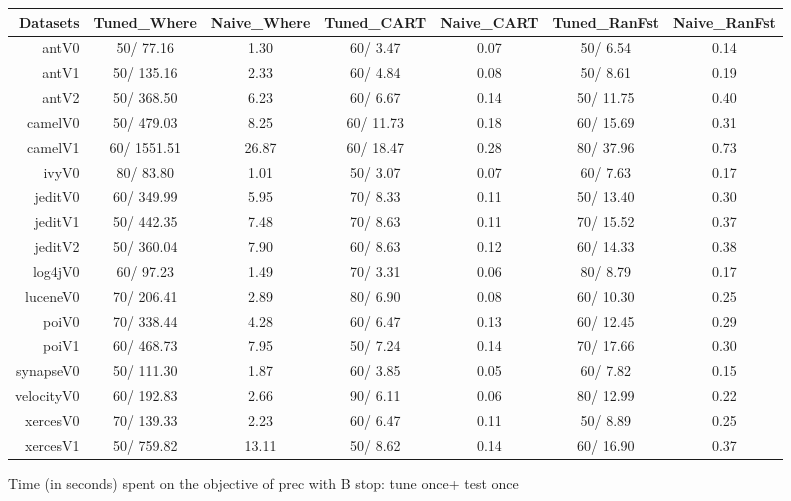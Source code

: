 \documentclass{acm_proc_article-sp}
\begin{document}
\begin{figure*}[!ht]
\scriptsize
\centering
  \begin{tabular}{r|c |c |c |c |c |c }
    \hline\hline
    Datasets & Tuned\_Where & Naive\_Where & Tuned\_CART & Naive\_CART & Tuned\_RanFst & Naive\_RanFst\\
    \hline
    antV0 & 50/ 77.16 & 1.30 & 60/ 3.47 & 0.07 & 50/ 6.54 & 0.14\\
    antV1 & 50/ 135.16 & 2.33 & 60/ 4.84 & 0.08 & 50/ 8.61 & 0.19\\
    antV2 & 50/ 368.50 & 6.23 & 60/ 6.67 & 0.14 & 50/ 11.75 & 0.40\\
    camelV0 & 50/ 479.03 & 8.25 & 60/ 11.73 & 0.18 & 60/ 15.69 & 0.31\\
    camelV1 & 60/ 1551.51 & 26.87 & 60/ 18.47 & 0.28 & 80/ 37.96 & 0.73\\
    ivyV0 & 80/ 83.80 & 1.01 & 50/ 3.07 & 0.07 & 60/ 7.63 & 0.17\\
    jeditV0 & 60/ 349.99 & 5.95 & 70/ 8.33 & 0.11 & 50/ 13.40 & 0.30\\
    jeditV1 & 50/ 442.35 & 7.48 & 70/ 8.63 & 0.11 & 70/ 15.52 & 0.37\\
    jeditV2 & 50/ 360.04 & 7.90 & 60/ 8.63 & 0.12 & 60/ 14.33 & 0.38\\
    log4jV0 & 60/ 97.23 & 1.49 & 70/ 3.31 & 0.06 & 80/ 8.79 & 0.17\\
    luceneV0 & 70/ 206.41 & 2.89 & 80/ 6.90 & 0.08 & 60/ 10.30 & 0.25\\
    poiV0 & 70/ 338.44 & 4.28 & 60/ 6.47 & 0.13 & 60/ 12.45 & 0.29\\
    poiV1 & 60/ 468.73 & 7.95 & 50/ 7.24 & 0.14 & 70/ 17.66 & 0.30\\
    synapseV0 & 50/ 111.30 & 1.87 & 60/ 3.85 & 0.05 & 60/ 7.82 & 0.15\\
    velocityV0 & 60/ 192.83 & 2.66 & 90/ 6.11 & 0.06 & 80/ 12.99 & 0.22\\
    xercesV0 & 70/ 139.33 & 2.23 & 60/ 6.47 & 0.11 & 50/ 8.89 & 0.25\\
    xercesV1 & 50/ 759.82 & 13.11 & 50/ 8.62 & 0.14 & 60/ 16.90 & 0.37\\
  \end{tabular}
  \caption{Time (in seconds) spent on the objective of prec with B stop: tune once+ test once}
\end{figure*}
\end{document}
